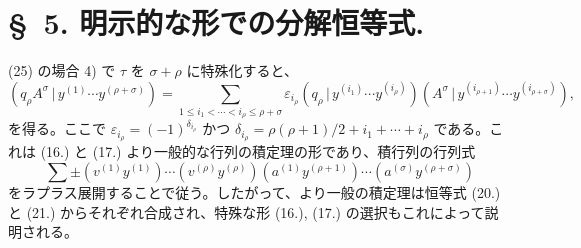 \documentclass[11pt]{article}
\newcommand{\pair}[2]{(#1\,|\,#2)}
\newcommand{\eps}{\varepsilon}
\begin{document}
\section*{\S\ 5. 明示的な形での分解恒等式.}
(25) の場合 4) で $\tau$ を $\sigma+\rho$ に特殊化すると、
\begin{equation}
 \pair{q_\rho A^\sigma}{y^{(1)}\cdots y^{(\rho+\sigma)}}
 =\sum_{1\le i_1<\cdots<i_\rho\le \rho+\sigma}
 \eps_{i_\rho}\pair{q_\rho}{y^{(i_1)}\cdots y^{(i_\rho)}}
 \pair{A^\sigma}{y^{(i_{\rho+1})}\cdots y^{(i_{\rho+\sigma})}},
\tag{32}
\end{equation}
を得る。ここで $\eps_{i_\rho}=(-1)^{\delta_{i_\rho}}$ かつ $\delta_{i_\rho}=\rho(\rho+1)/2+i_1+\cdots+i_\rho$ である。これは (16.) と (17.) より一般的な行列の積定理の形であり、積行列の行列式
\[
 \sum\pm(v^{(1)}y^{(1)})\cdots(v^{(\rho)}y^{(\rho)})(a^{(1)}y^{(\rho+1)})\cdots(a^{(\sigma)}y^{(\rho+\sigma)})
\]
をラプラス展開することで従う。したがって、より一般の積定理は恒等式 (20.) と (21.) からそれぞれ合成され、特殊な形 (16.), (17.) の選択もこれによって説明される。
\end{document}
